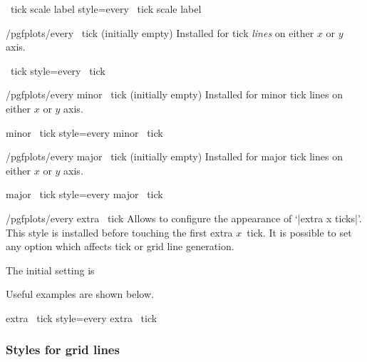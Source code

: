 \pgfplotsshortxystylekey \x\ tick scale label style=every \x\ tick scale label\pgfeov

\begin{xystylekey}{/pgfplots/every \x\ tick (initially empty)}
	Installed for tick \emph{lines} on either $x$ or $y$ axis.
\end{xystylekey}

\pgfplotsshortxystylekey \x\ tick style=every \x\ tick\pgfeov

\begin{xystylekey}{/pgfplots/every minor \x\ tick (initially empty)}
	Installed for minor tick lines on either $x$ or $y$ axis.
\end{xystylekey}

\pgfplotsshortxystylekey minor \x\ tick style=every minor \x\ tick\pgfeov

\begin{xystylekey}{/pgfplots/every major \x\ tick (initially empty)}
	Installed for major tick lines on either $x$ or $y$ axis.
\end{xystylekey}
\pgfplotsshortxystylekey major \x\ tick style=every major \x\ tick\pgfeov

\begin{xystylekey}{/pgfplots/every extra \x\ tick}
 Allows to configure the appearance of `|extra x ticks|'. This style is installed before touching the first extra $x$~tick. It is possible to set any option which affects tick or grid line generation.

The initial setting is
\begin{codeexample}
\end{codeexample}

 Useful examples are shown below.
\begin{codeexample}
\end{codeexample}
\end{xystylekey}

\pgfplotsshortxystylekey extra \x\ tick style=every extra \x\ tick\pgfeov



\subsubsection*{Styles for grid lines}

